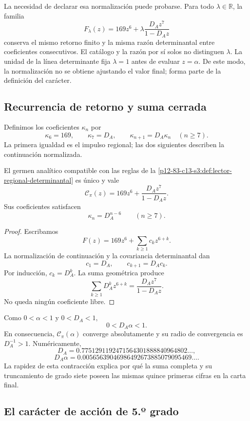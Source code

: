 La necesidad de declarar esa normalización puede probarse. Para todo
\(\lambda\in\mathbb R\), la familia
\[
F_\lambda(z)
=169z^6+\lambda\frac{D_Az^7}{1-D_Az}
\]
conserva el mismo retorno finito y la misma razón determinantal entre
coeficientes consecutivos. El catálogo y la razón por sí solos no distinguen
\(\lambda\). La unidad de la línea determinante fija
\(\lambda=1\) antes de evaluar \(z=\alpha\). De este modo, la normalización
no se obtiene ajustando el valor final; forma parte de la definición del
carácter.

\subsection{Recurrencia de retorno y suma cerrada}

Definimos los coeficientes \(\kappa_n\) por
\[
\kappa_6=169,
\qquad
\kappa_7=D_A,
\qquad
\kappa_{n+1}=D_A\kappa_n\quad(n\ge7).
\]
La primera igualdad es el impulso regional; las dos siguientes describen la
continuación normalizada.

\begin{theorem}
\label{p12-83-c13-s3:thm:realizacion-analitica-graduada}
El germen analítico compatible con las reglas de la
\cref{p12-83-c13-s3:def:lector-regional-determinantal} es único y vale
\[
\boxed{
\mathscr C_\pi(z)
=169z^6+\frac{D_Az^7}{1-D_Az}.}
\]
Sus coeficientes satisfacen
\[
\kappa_n=D_A^{n-6}\qquad(n\ge7).
\]
\end{theorem}

\begin{proof}
Escribamos
\[
F(z)=169z^6+\sum_{k\ge1}c_kz^{6+k}.
\]
La normalización de continuación y la covariancia determinantal dan
\[
c_1=D_A,
\qquad
c_{k+1}=D_Ac_k.
\]
Por inducción, \(c_k=D_A^k\). La suma geométrica produce
\[
\sum_{k\ge1}D_A^kz^{6+k}
=\frac{D_Az^7}{1-D_Az}.
\]
No queda ningún coeficiente libre.
\end{proof}

Como \(0<\alpha<1\) y \(0<D_A<1\),
\[
0<D_A\alpha<1.
\]
En consecuencia, \(\mathscr C_\pi(\alpha)\) converge absolutamente y su
radio de convergencia es \(D_A^{-1}>1\). Numéricamente,
\[
D_A=0.7751291192471564301888840964802\ldots,
\]
\[
D_A\alpha=0.00565639046986492673885079095469\ldots.
\]
La rapidez de esta contracción explica por qué la suma completa y su
truncamiento de grado siete poseen las mismas quince primeras cifras en la
carta final.

\subsection{El carácter de acción de 5.º grado}

